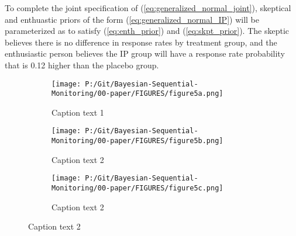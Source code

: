 \documentclass[12pt]{article}
\begin{document}
To complete the joint specification of (\ref{eq:generalized_normal_joint}), skeptical and enthuastic priors of the form (\ref{eq:generalized_normal_IP}) will be parameterized as to satisfy (\ref{eq:enth_prior}) and (\ref{eq:skpt_prior}). The skeptic believes there is no difference in response rates by treatment group, and the enthusiastic person believes the IP group will have a response rate probability that is 0.12 higher than the placebo group. 

%



\begin{figure}
  \begin{subfigure}{6cm}
    \centering\texttt{[image: P:/Git/Bayesian-Sequential-Monitoring/00-paper/FIGURES/figure5a.png]}
    \caption{Caption text 1}
  \end{subfigure}
  \begin{subfigure}{6cm}
    \centering\texttt{[image: P:/Git/Bayesian-Sequential-Monitoring/00-paper/FIGURES/figure5b.png]}
    \caption{Caption text 2}
  \end{subfigure}
  \begin{subfigure}{6cm}
    \centering\texttt{[image: P:/Git/Bayesian-Sequential-Monitoring/00-paper/FIGURES/figure5c.png]}
    \caption{Caption text 2}
  \end{subfigure}
 \end{figure}

\end{document}
